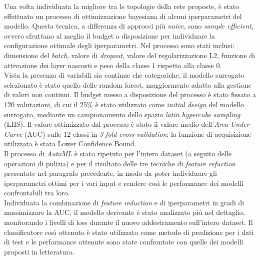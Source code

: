 Una volta individuata la migliore tra le topologie della rete proposte, è stato effettuato un processo di ottimizzazione bayesiana di alcuni iperparametri del modello. Questa tecnica, a differenza di approcci più \textit{naive}, sono \textit{sample efficient}, ovvero sfruttano al meglio il budget a disposizione per individuare la configurazione ottimale degli iperparametri. Nel processo sono stati inclusi: dimensione del \textit{batch}, valore di \textit{dropout}, valore del regolarizzazione L2, funzione di attivazione dei layer nascosti e peso della classe 1 rispetto alla classe 0.\\
Vista la presenza di variabili sia continue che categoriche, il modello surrogato selezionato è stato quello delle random forest, maggiormente adatto alla gestione di valori non continui. Il budget messo a disposizione del processo è stato fissato a 120 valutazioni, di cui il 25\% è stato utilizzato come \textit{initial design} del modello surrogato, mediante un campionamento dello spazio \textit{latin hypercube sampling} (LHS). Il valore ottimizzato dal processo è stato il valore medio dell'\textit{Area Under Curve} (AUC) sulle $12$ classi in \textit{3-fold cross validation}; la funzione di acquisizione utilizzata è stata Lower Confidence Bound.\\
Il processo di \textit{AutoML} è stato ripetuto per l'intero dataset (a seguito delle operazioni di pulizia) e per il risultato delle tre tecniche di \textit{feature refuction} presentate nel paragrafo precedente, in modo da poter individuare gli iperparametri ottimi per i vari input e rendere così le performance dei modelli confrontabili tra loro.\\

Individuata la combinazione di \textit{feature reduction} e di iperparametri in gradi di massimizzare la AUC, il modello derivante è stato analizzato più nel dettaglio, monitorando i livelli di loss durante il nuovo addestramento sull'intero dataset.
Il classificatore così ottenuto è stato utilizzato come metodo di predizione per i dati di test e le performance ottenute sono state confrontate con quelle dei modelli proposti in letteratura.\\
